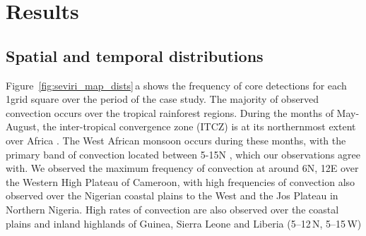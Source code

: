 \documentclass[acp, manuscript]{copernicus}
\begin{document}
\section{Results}

\subsection{Spatial and temporal distributions}

Figure~\ref{fig:seviri_map_dists}\,a shows the frequency of core detections for each 1\textdegree grid square over the period of the case study. 
The majority of observed convection occurs over the tropical rainforest regions. 
During the months of May-August, the inter-tropical convergence zone (ITCZ) is at its northernmost extent over Africa \citep{nicholson_itcz_2018}. 
The West African monsoon occurs during these months, with the primary band of convection located between 5-15\textdegree N \citep{nicholson_revised_2009}, which our observations agree with. 
We observed the maximum frequency of convection at around 6\textdegree N, 12\textdegree E over the Western High Plateau of Cameroon, with high frequencies of convection also observed over the Nigerian coastal plains to the West and the Jos Plateau in Northern Nigeria. 
High rates of convection are also observed over the coastal plains and inland highlands of Guinea, Sierra Leone and Liberia (5--12\,\textdegree N, 5--15\,\textdegree W)
\end{document}

